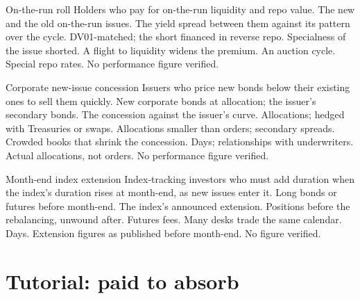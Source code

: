\begin{strategyfile}{On-the-run roll}\label{strat:s2:supply-trades:roll}
 Holders who pay for on-the-run liquidity and repo value.
 The new and the old on-the-run issues.
 The yield spread between them against its pattern over the cycle.
 DV01-matched; the short financed in reverse repo.
 Specialness of the issue shorted.
 A flight to liquidity widens the premium.
 An auction cycle.
 Special repo rates.
 No performance figure verified.
\end{strategyfile}

\begin{strategyfile}{Corporate new-issue concession}\label{strat:s2:supply-trades:corporate}
 Issuers who price new bonds below their existing ones to sell them quickly.
 New corporate bonds at allocation; the issuer's secondary bonds.
 The concession against the issuer's curve.
 Allocations; hedged with Treasuries or swaps.
 Allocations smaller than orders; secondary spreads.
 Crowded books that shrink the concession.
 Days; relationships with underwriters.
 Actual allocations, not orders.
 No performance figure verified.
\end{strategyfile}

\begin{strategyfile}{Month-end index extension}\label{strat:s2:supply-trades:extension}
 Index-tracking investors who must add duration when the index's duration rises at month-end, as new issues enter it.
 Long bonds or futures before month-end.
 The index's announced extension.
 Positions before the rebalancing, unwound after.
 Futures fees.
 Many desks trade the same calendar.
 Days.
 Extension figures as published before month-end.
 No figure verified.
\end{strategyfile}

\section{Tutorial: paid to absorb}\label{tut:s2:supply-trades:tut}

